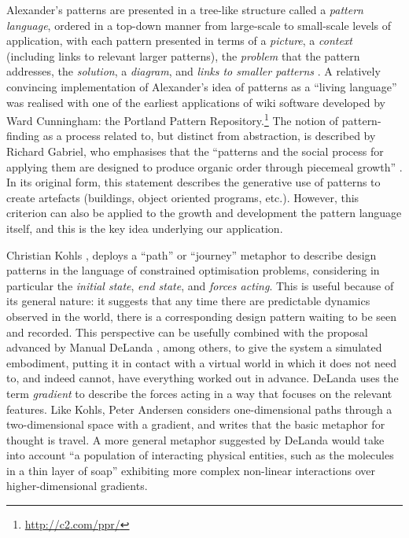 Alexander's patterns are presented in a tree-like structure called a
\emph{pattern language}, ordered in a top-down manner from large-scale
to small-scale levels of application, with each pattern presented in
terms of a \emph{picture}, a \emph{context} (including links to
relevant larger patterns), the \emph{problem} that the pattern
addresses, the \emph{solution}, a \emph{diagram}, and \emph{links to
  smaller patterns} \cite[pp. x-xi]{alexander1977pattern}.
%
A relatively convincing implementation of
Alexander's idea of patterns as a ``living
  language''
\cite[p. xvii]{alexander1977pattern} was realised
with one of the earliest applications of wiki
software developed by Ward Cunningham: the
Portland Pattern
Repository.\footnote{\url{http://c2.com/ppr/}}
The notion of pattern-finding as a process
related to, but distinct from abstraction, is
described by Richard Gabriel, who emphasises that
the ``patterns and the social process for
  applying them are designed to produce organic
  order through piecemeal growth''
\cite[p. 31]{gabriel1996patterns}.
%
In its original form, this statement describes the generative use of
patterns to create artefacts (buildings, object oriented programs,
etc.).  However, this criterion can also be applied to the growth and
development the pattern language itself, and this is the key idea
underlying our application.

Christian Kohls \cite{kohls2010structure,kohls2011structure}, deploys
a ``path'' or ``journey'' metaphor to describe design patterns in the
language of constrained optimisation problems, considering in
particular the \emph{initial state}, \emph{end state}, and
\emph{forces acting}.  This is useful because of its general nature:
it suggests that any time there are predictable dynamics observed in
the world, there is a corresponding design pattern waiting to be seen
and recorded.  This perspective can be usefully combined with the
proposal advanced by Manual DeLanda \cite{delanda2011philosophy},
among others, to give the system a simulated embodiment, putting it in
contact with a virtual world in which it does not need to, and indeed
cannot, have everything worked out in advance.  DeLanda uses the term
\emph{gradient} to describe the forces acting in a way that focuses on
the relevant features.  Like Kohls, Peter Andersen
\cite{andersen2002dynamic} considers one-dimensional paths through a
two-dimensional space with a gradient, and writes that the basic
metaphor for thought is travel.  A more general metaphor suggested
by DeLanda would take into account
%
``a population of interacting physical entities, such as the molecules
in a thin layer of soap'' \cite{delanda2005deleuze} exhibiting more
complex non-linear interactions over higher-dimensional gradients.


